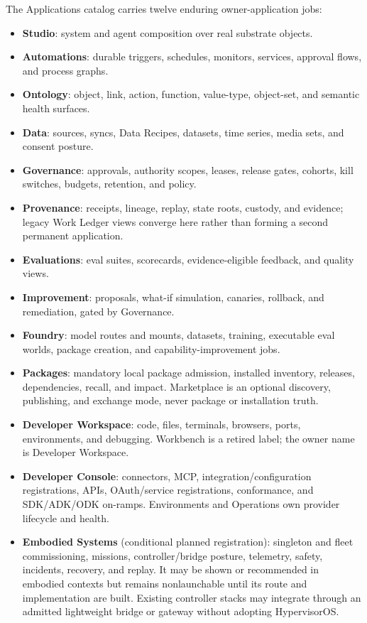 \documentclass[
  11pt,
]{article}
\providecommand{\tightlist}{%
  \setlength{\itemsep}{0pt}\setlength{\parskip}{0pt}}
\begin{document}
The Applications catalog carries twelve enduring owner-application jobs:

\begin{itemize}
\tightlist
\item
  \textbf{Studio}: system and agent composition over real substrate
  objects.
\item
  \textbf{Automations}: durable triggers, schedules, monitors, services,
  approval flows, and process graphs.
\item
  \textbf{Ontology}: object, link, action, function, value-type, object-set,
  and semantic health surfaces.
\item
  \textbf{Data}: sources, syncs, Data Recipes, datasets, time series,
  media sets, and consent posture.
\item
  \textbf{Governance}: approvals, authority scopes, leases, release gates,
  cohorts, kill switches, budgets, retention, and policy.
\item
  \textbf{Provenance}: receipts, lineage, replay, state roots, custody, and
  evidence; legacy Work Ledger views converge here rather than forming a
  second permanent application.
\item
  \textbf{Evaluations}: eval suites, scorecards, evidence-eligible feedback,
  and quality views.
\item
  \textbf{Improvement}: proposals, what-if simulation, canaries, rollback,
  and remediation, gated by Governance.
\item
  \textbf{Foundry}: model routes and mounts, datasets, training, executable
  eval worlds, package creation, and capability-improvement jobs.
\item
  \textbf{Packages}: mandatory local package admission, installed inventory,
  releases, dependencies, recall, and impact. Marketplace is an optional
  discovery, publishing, and exchange mode, never package or installation
  truth.
\item
  \textbf{Developer Workspace}: code, files, terminals, browsers, ports,
  environments, and debugging. Workbench is a retired label; the owner name is Developer Workspace.
\item
  \textbf{Developer Console}: connectors, MCP, integration/configuration
  registrations, APIs, OAuth/service registrations, conformance, and
  SDK/ADK/ODK on-ramps. Environments and Operations own provider lifecycle and
  health.
\item
  \textbf{Embodied Systems} (conditional planned registration): singleton and fleet
  commissioning, missions, controller/bridge posture, telemetry, safety,
  incidents, recovery, and replay. It may be shown or recommended in embodied
  contexts but remains nonlaunchable until its route and implementation are
  built. Existing
  controller stacks may integrate through an admitted lightweight bridge or
  gateway without adopting HypervisorOS.
\end{itemize}
\end{document}
